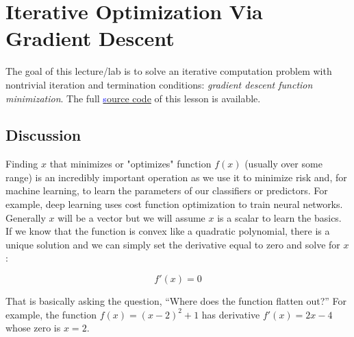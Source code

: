 \documentclass[titlepage]{tufte-book}
\newcounter{problem}
\begin{document}
\chapter{Iterative Optimization Via Gradient Descent}

\begin{fullwidth}

The goal of this lecture/lab is to solve an iterative computation problem with nontrivial iteration and termination conditions: {\em gradient descent function minimization}. The full \href{https://github.com/parrt/msan501/blob/master/notes/code/descent.py}{\textcolor{blue}source code} of this lesson is available.

\section{Discussion}

Finding $x$ that minimizes or "optimizes" function $f(x)$ (usually over some range) is an incredibly important operation as we use it to minimize risk and, for machine learning, to learn the parameters of our classifiers or predictors. For example, deep learning uses cost function optimization to train neural networks. Generally $x$ will be a vector but we will assume $x$ is a scalar to learn the basics. If we know that the function is convex like a quadratic polynomial, there is a unique solution and we can simply set the derivative equal to zero and solve for $x$:

\[\tag{Analytic solution to optimization}
f'(x) = 0
\]

\noindent That is basically asking the question, ``Where does the function flatten out?''  For example, the function $f(x) = (x-2)^2 + 1$ has derivative $f'(x) = 2x - 4$ whose zero is $x=2$.

\begin{center}
\end{center}


\end{fullwidth}
\end{document}
